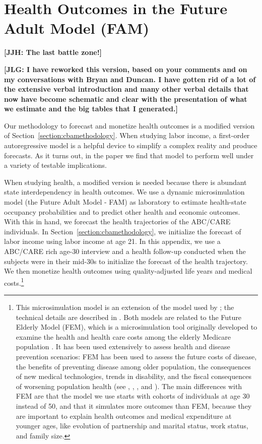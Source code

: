 \section{Health Outcomes in the Future Adult Model (FAM)} \label{appendix:health}

\noindent \textbf{[JJH: The last battle zone!]}

\noindent \textbf{[JLG: I have reworked this version, based on your comments and on my conversations with Bryan and Duncan. I have gotten rid of a lot of the extensive verbal introduction and many other verbal details that now have become schematic and clear with the presentation of what we estimate and the big tables that I generated.]}

Our methodology to forecast and monetize health outcomes is a modified version of Section~\ref{section:cbamethodology}. When studying labor income, a first-order autoregressive model is a helpful device to simplify a complex reality and produce forecasts. As it turns out, in the paper we find that model to perform well under a variety of testable implications. 

When studying health, a modified version is needed because there is abundant state interdependency in health outcomes. We use a dynamic microsimulation model (the Future Adult Model - FAM) as laboratory to estimate health-state occupancy probabilities and to predict other health and economic outcomes. With this in hand, we forecast the health trajectories of the ABC/CARE individuals. In Section~\ref{section:cbamethodology}, we initialize the forecast of labor income using labor income at age 21. In this appendix, we use a ABC/CARE rich age-30 interview and a health follow-up conducted when the subjects were in their mid-30s to initialize the forecast of the health trajectory. We then monetize health outcomes using quality-adjusted life years and medical costs.\footnote{This microsimulation model is an extension of the model used by \citet{Prados_etal_2015_How-Much-Can-Education}; the technical details are described in \citet{Goldman_etal_2015_Future-Adult-Model}. Both models are related to the Future Elderly Model (FEM), which is a microsimulation tool originally developed to examine the health and health care costs among the elderly Medicare population \citep{Goldman_etal_2004_RAND-Report_Health-Status-Elderly}. It has been used extensively to assess health and disease prevention scenarios: FEM has been used to assess the future costs of disease, the benefits of preventing disease among older population, the consequences of new medical technologies, trends in disability, and the fiscal consequences of worsening population health (see \citet{Goldman_etal_2004_RAND-Report_Health-Status-Elderly}, \citet{Lakdawalla_etal_2004_Health-and-Cost}, \citet{Goldman_etal_2005_HA}, and \citet{Zissimopoulos_etal_2014_Delaying-Alzheimers}). The main differences with FEM are that the model we use starts with cohorts of individuals at age 30 instead of 50, and that it simulates more outcomes than FEM, because they are important to explain health outcomes and medical expenditure at younger ages, like evolution of partnership and marital status, work status, and family size.}

